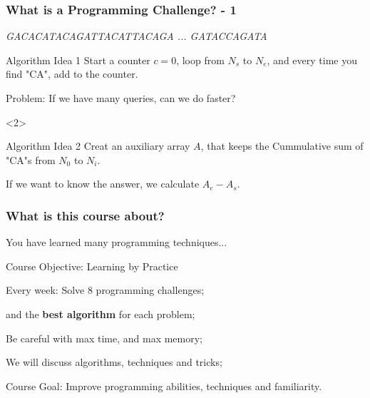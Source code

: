\documentclass{beamer}
\begin{document}
\begin{frame}[t]
  \frametitle{What is a Programming Challenge? - 1}

  \begin{center}
    \emph{GACACATACAGATTACATTACAGA ... GATACCAGATA}
  \end{center}

  \begin{block}{Algorithm Idea 1}
    Start a counter $c = 0$, loop from $N_s$ to $N_e$,
    and every time you find "CA", add to the counter.
    \bigskip

    \alert{Problem: If we have many queries, can we do faster?}
  \end{block}

  \begin{onlyenv}<2>

  \begin{block}{Algorithm Idea 2}
    Creat an auxiliary array $A$, that keeps the \alert{Cummulative sum} of "CA"s from $N_0$ to $N_i$.

    \bigskip

    If we want to know the answer, we calculate $A_e - A_s$.
  \end{block}
  \end{onlyenv}
\end{frame}




\begin{frame}
  \frametitle{What is this course about?}

  You have learned many programming techniques...\\\hfill {}

  \begin{block}{Course Objective: Learning by Practice}
    \begin{itemize}
      {\small
    \item Every week: Solve 8 programming challenges;
    \item {} and  the {\bf best algorithm} for each problem;
    \item Be careful with \alert{max time}, and \alert{max memory};
    \item We will discuss algorithms, techniques and tricks;
      }
    \end{itemize}
  \end{block}

  \begin{exampleblock}{Course Goal:}
    Improve programming abilities, techniques and familiarity.
  \end{exampleblock}
\end{frame}
\end{document}
